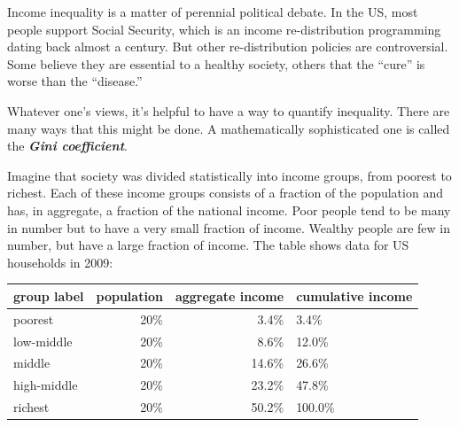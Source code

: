 \documentclass[
  letterpaper,
  DIV=11,
  numbers=noendperiod,
  oneside]{article}
\begin{document}
\begin{multicols}{2}
\begin{table}
\begin{minipage}[t]{\linewidth}
{Income inequality is a matter of perennial political debate. In the US,
most people support Social Security, which is an income re-distribution
programming dating back almost a century. But other re-distribution
policies are controversial. Some believe they are essential to a healthy
society, others that the ``cure'' is worse than the ``disease.''

}

\end{minipage}%
\newline
\begin{minipage}[t]{\linewidth}

{\centering 

Whatever one's views, it's helpful to have a way to quantify inequality.
There are many ways that this might be done. A mathematically
sophisticated one is called the \textbf{\emph{Gini coefficient}}.

}

\end{minipage}%
\newline
\begin{minipage}[t]{\linewidth}

{\centering 

Imagine that society was divided statistically into income groups, from
poorest to richest. Each of these income groups consists of a fraction
of the population and has, in aggregate, a fraction of the national
income. Poor people tend to be many in number but to have a very small
fraction of income. Wealthy people are few in number, but have a large
fraction of income. The table shows data for US households in
2009:

}

\end{minipage}%
\newline
\begin{minipage}[t]{\linewidth}

{\centering 

\begin{longtable}[]{@{}lrrl@{}}
\toprule()
group label & population & aggregate income & cumulative income \\
\midrule()
\endhead
poorest & 20\% & 3.4\% & 3.4\% \\
low-middle & 20\% & 8.6\% & 12.0\% \\
middle & 20\% & 14.6\% & 26.6\% \\
high-middle & 20\% & 23.2\% & 47.8\% \\
richest & 20\% & 50.2\% & 100.0\% \\
\bottomrule()
\end{longtable}

}
\end{minipage}
\end{table}
\end{multicols}
\end{document}
